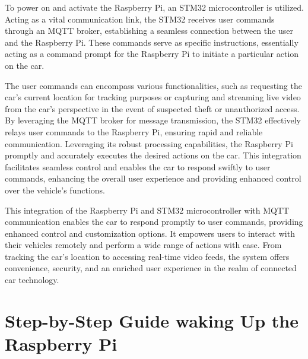 \documentclass[
12pt,
oneside, 
onehalfspacing, 
nolistspacing, 
parskip, 
chapterinoneline, 
]{AASTCOMPUTER}
\begin{document}
To power on and activate the Raspberry Pi, an STM32 microcontroller is utilized. Acting as a vital communication link, the STM32 receives user commands through an MQTT broker, establishing a seamless connection between the user and the Raspberry Pi. These commands serve as specific instructions, essentially acting as a command prompt for the Raspberry Pi to initiate a particular action on the car.

The user commands can encompass various functionalities, such as requesting the car's current location for tracking purposes or capturing and streaming live video from the car's perspective in the event of suspected theft or unauthorized access. By leveraging the MQTT broker for message transmission, the STM32 effectively relays user commands to the Raspberry Pi, ensuring rapid and reliable communication. Leveraging its robust processing capabilities, the Raspberry Pi promptly and accurately executes the desired actions on the car. This integration facilitates seamless control and enables the car to respond swiftly to user commands, enhancing the overall user experience and providing enhanced control over the vehicle's functions.

This integration of the Raspberry Pi and STM32 microcontroller with MQTT communication enables the car to respond promptly to user commands, providing enhanced control and customization options. It empowers users to interact with their vehicles remotely and perform a wide range of actions with ease. From tracking the car's location to accessing real-time video feeds, the system offers convenience, security, and an enriched user experience in the realm of connected car technology.

\section{Step-by-Step Guide waking Up the Raspberry Pi}
\end{document}

